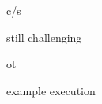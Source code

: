
\begin{frame}{}
  \centerline{\Huge {}}
\end{frame}

\begin{frame}{}
  c/s

  still challenging
\end{frame}

\begin{frame}{}
  ot
\end{frame}

\begin{frame}{}
  example execution
\end{frame}

